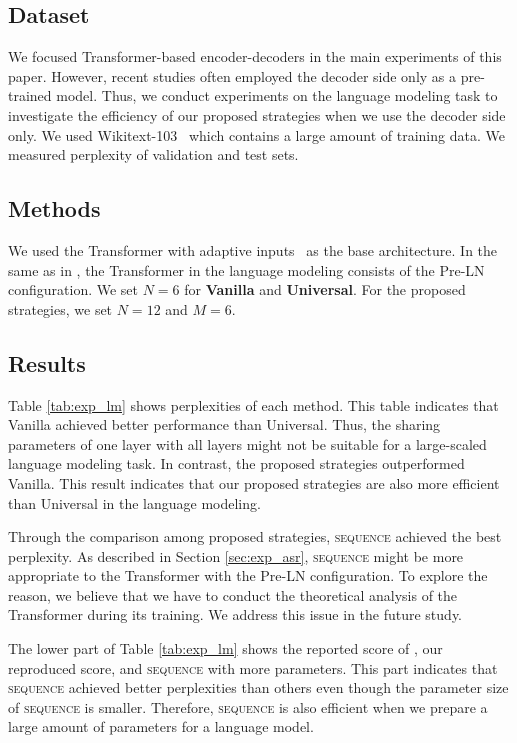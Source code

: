 \documentclass[11pt]{article}
\begin{document}
\subsection{Dataset}
We focused Transformer-based encoder-decoders in the main experiments of this paper.
However, recent studies often employed the decoder side only as a pre-trained model.
Thus, we conduct experiments on the language modeling task to investigate the efficiency of our proposed strategies when we use the decoder side only.
We used Wikitext-103~\cite{DBLP:journals/corr/MerityXBS16} which contains a large amount of training data.
We measured perplexity of validation and test sets.


\subsection{Methods}
We used the Transformer with adaptive inputs~\cite{DBLP:journals/corr/abs-1809-10853} as the base architecture.
In the same as in , the Transformer in the language modeling consists of the Pre-LN configuration.
We set $N=6$ for \textbf{Vanilla} and \textbf{Universal}.
For the proposed strategies, we set $N=12$ and $M=6$.

\subsection{Results}
Table \ref{tab:exp_lm} shows perplexities of each method.
This table indicates that Vanilla achieved better performance than Universal.
Thus, the sharing parameters of one layer with all layers might not be suitable for a large-scaled language modeling task.
In contrast, the proposed strategies outperformed Vanilla.
This result indicates that our proposed strategies are also more efficient than Universal in the language modeling.


Through the comparison among proposed strategies, \textsc{sequence} achieved the best perplexity.
As described in Section \ref{sec:exp_asr}, \textsc{sequence} might be more appropriate to the Transformer with the Pre-LN configuration.
To explore the reason, we believe that we have to conduct the theoretical analysis of the Transformer during its training.
We address this issue in the future study.

The lower part of Table \ref{tab:exp_lm} shows the reported score of , our reproduced score, and \textsc{sequence} with more parameters.
This part indicates that \textsc{sequence} achieved better perplexities than others even though the parameter size of \textsc{sequence} is smaller.
Therefore, \textsc{sequence} is also efficient when we prepare a large amount of parameters for a language model.
\end{document}
